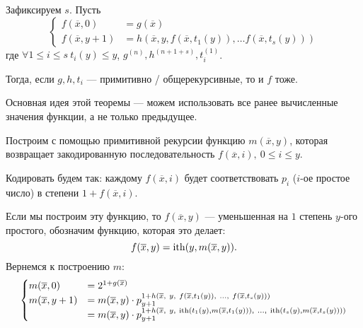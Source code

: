\begin{thm}
    Зафиксируем $ s$. Пусть 
	\[
	\begin{cases}
		f(\overline{x}, 0) &= g(\overline{x}) \\
		f(\overline{x}, y+1) &= h(\overline{x}, y, f(\overline{x}, t_1(y)), \ldots f(\overline{x}, t_{s}(y)))
	\end{cases}
	\] 
	где $ \forall 1 \le i \le s ~t_i(y) \le y$, $ g^{(n)}, h^{(n+1+s)}, t_i^{(1)}$.

	\noindent
	Тогда, если $ g, h, t_i$ --- примитивно / общерекурсивные, то и $ f$ тоже.
\end{thm}
Основная идея этой теоремы --- можем использовать все ранее вычисленные значения функции, а не только предыдущее.
\begin{proof*}
	Построим с помощью примитивной рекурсии функцию $ m(\overline{x}, y)$, которая возвращает закодированную последовательность $ f(\overline{x}, i), ~ 0 \le i \le y$.

	Кодировать будем так: каждому $ f(\overline{x}, i)$ будет соответствовать $ p_i$ ($ i$-ое простое число) в степени $ 1 + f(\overline{x}, i)$. 

	Если мы построим эту функцию, то $ f(\overline{x}, y)$ --- уменьшенная на $ 1$ степень $ y$-ого простого, обозначим функцию, которая это делает:
	\[
		f(\overline{x}, y) = \operatorname{ith}(y, m(\overline{x}, y))
	.\] 
	Вернемся к построению $ m$:
	\[
	\begin{cases}
		m(\overline{x}, 0) &= 2^{1+g(\overline{x})} \\
		m(\overline{x}, y+1) &= m(\overline{x}, y) \cdot p_{y+1}^{1 + h\left(\overline{x}, ~y, ~f(\overline{x}, t_1(y)), ~\ldots, ~f(\overline{x}, t_s(y))\right)} \\
		&= m(\overline{x}, y) \cdot p_{y+1}^{1+h\left( 
			\overline{x}, ~y, ~\operatorname{ith}(t_1(y), m(\overline{x}, t_1(y))), ~\ldots, ~ \operatorname{ith}(t_{s}(y), m(\overline{x}, t_{s}(y)))
	\right)
}
	\end{cases}
	\] 
\end{proof*}


